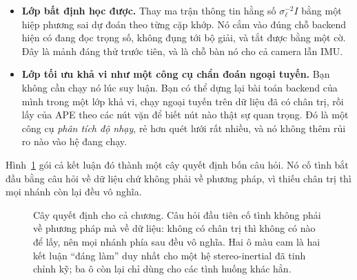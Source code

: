 \documentclass[../../deep_learning.tex]{subfiles}
\begin{document}
\begin{itemize}
\item \textbf{Lớp bất định học được.} Thay ma trận thông tin hằng số \(\sigma_\ell^{-2}I\) bằng một hiệp phương sai dự đoán theo từng cặp khớp. Nó cắm vào đúng chỗ backend hiện có đang đọc trọng số, không đụng tới bộ giải, và tắt được bằng một cờ. Đây là mảnh đáng thử trước tiên, và  là chỗ bàn nó cho cả camera lẫn IMU.
\item \textbf{Lớp tối ưu khả vi như một công cụ chẩn đoán ngoại tuyến.} Bạn không cần chạy nó lúc suy luận. Bạn có thể dựng lại bài toán backend của mình trong một lớp khả vi, chạy ngoại tuyến trên dữ liệu đã có chân trị, rồi lấy  của APE theo các nút vặn để biết nút nào thật sự quan trọng. Đó là một công cụ \emph{phân tích độ nhạy}, rẻ hơn quét lưới rất nhiều, và nó không thêm rủi ro nào vào hệ đang chạy.
\end{itemize}

Hình~\ref{fig:f31-cay-quyet-dinh} gói cả kết luận đó thành một cây quyết định bốn câu hỏi. Nó cố tình bắt đầu bằng câu hỏi về dữ liệu chứ không phải về phương pháp, vì thiếu chân trị thì mọi nhánh còn lại đều vô nghĩa.

\begin{figure}[H]\centering
{}
\caption{Cây quyết định cho cả chương. Câu hỏi đầu tiên cố tình không phải về phương pháp mà về dữ liệu: không có chân trị thì không có  nào để lấy, nên mọi nhánh phía sau đều vô nghĩa. Hai ô màu cam là hai kết luận ``đáng làm'' duy nhất cho một hệ stereo-inertial đã tinh chỉnh kỹ; ba ô còn lại chỉ dùng cho các tình huống khác hẳn.}
\label{fig:f31-cay-quyet-dinh}
\end{figure}
\end{document}
